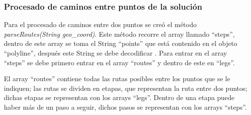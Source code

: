 \subsubsection{Procesado de caminos entre puntos de la solución}
Para el procesado de caminos entre dos puntos se creó el método \textit{parseRoutes(String geo\_coord)}. Este método recorre el array llamado \enquote{steps}, dentro de este array se toma el String \enquote{points} que está contenido en el objeto \enquote{polyline}, después este String se debe decodificar \cite{decode_polyline}. Para entrar en el array \enquote{steps} se debe primero entrar en el array \enquote{routes} y dentro de este en \enquote{legs}.\newline

El array \enquote{routes} contiene todas las rutas posibles entre los puntos que se le indiquen; las rutas se dividen en etapas, que representan la ruta entre dos puntos; dichas etapas se representan con los arrays \enquote{legs}. Dentro de una etapa puede haber más de un paso a seguir, dichos pasos se representan con los arrays \enquote{steps}.\newline

